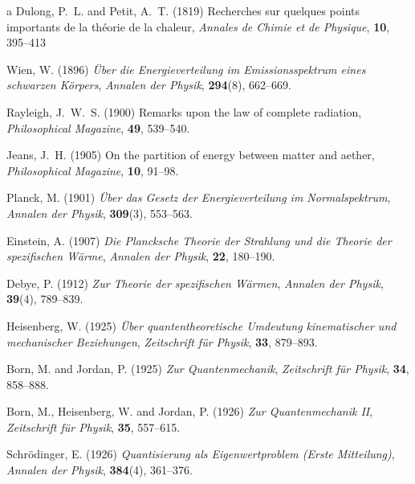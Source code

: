 \documentclass[11pt,a4paper,spanish]{book}
\begin{document}
\begin{thebibliography}{a}
Dulong, P.~L. and Petit, A.~T. (1819)
Recherches sur quelques points importants de la th\'eorie de la chaleur,
\textit{Annales de Chimie et de Physique}, \textbf{10}, 395--413

Wien, W. (1896)
\emph{\"Uber die Energieverteilung im Emissionsspektrum eines schwarzen K\"orpers},
\textit{Annalen der Physik}, \textbf{294}(8), 662--669.

Rayleigh, J.~W.~S. (1900)
Remarks upon the law of complete radiation,
\textit{Philosophical Magazine}, \textbf{49}, 539--540.

Jeans, J.~H. (1905)
On the partition of energy between matter and aether,
\textit{Philosophical Magazine}, \textbf{10}, 91--98.

Planck, M. (1901)
\emph{\"Uber das Gesetz der Energieverteilung im Normalspektrum},
\textit{Annalen der Physik}, \textbf{309}(3), 553--563.

Einstein, A. (1907)
\emph{Die Plancksche Theorie der Strahlung und die Theorie der spezifischen W\"arme},
\textit{Annalen der Physik}, \textbf{22}, 180--190.


Debye, P. (1912)
\emph{Zur Theorie der spezifischen W\"armen},
\textit{Annalen der Physik}, \textbf{39}(4), 789--839.

Heisenberg, W. (1925)
\emph{\"Uber quantentheoretische Umdeutung kinematischer und mechanischer Beziehungen},
\textit{Zeitschrift f\"ur Physik}, \textbf{33}, 879--893.

Born, M. and Jordan, P. (1925)
\emph{Zur Quantenmechanik},
\textit{Zeitschrift f\"ur Physik}, \textbf{34}, 858--888.

Born, M., Heisenberg, W. and Jordan, P. (1926)
\emph{Zur Quantenmechanik II},
\textit{Zeitschrift f\"ur Physik}, \textbf{35}, 557--615.

Schr\"odinger, E. (1926)
\emph{Quantisierung als Eigenwertproblem (Erste Mitteilung)},
\textit{Annalen der Physik}, \textbf{384}(4), 361--376.


\end{thebibliography}
\end{document}
